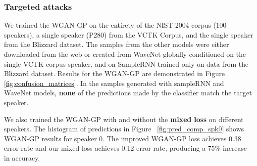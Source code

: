 \subsubsection{Targeted attacks}\label{sub:targeted}
We trained the WGAN-GP on the entirety of the NIST 2004 corpus (100 speakers), a single speaker (P280) from
the VCTK Corpus, and the single speaker from the Blizzard dataset. The samples
from the other models were either downloaded from the
web or created from WaveNet globally conditioned on the single VCTK corpus
speaker, and on SampleRNN trained only on data from the Blizzard dataset.
Results for the WGAN-GP are demonstrated in Figure \ref{fig:confusion_matrices}.  
In the samples generated with sampleRNN and WaveNet models, \textbf{none} of the
predictions made by the classifier match the target speaker. 

We also trained the WGAN-GP with and without the \textbf{mixed loss} on
different speakers. The histogram of predictions in Figure
~\ref{fig:pred_comp_spk0} shows WGAN-GP results for speaker 0. The improved
WGAN-GP loss achieves 0.38 error rate and our mixed loss achieves 0.12 error
rate, producing a 75\% increase in accuracy. 

